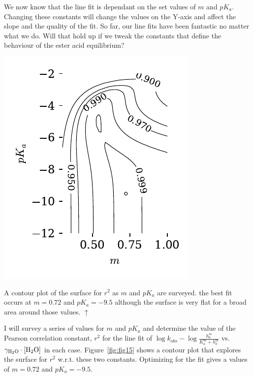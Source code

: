 \documentclass[]{tufte-handout}
\begin{document}
We now know that the line fit is dependant on the set values of $m$ and $pK_a$. Changing these constants will change the values on the Y-axis and affect the slope and the quality of the fit. So far, our line fits have been fantastic no matter what we do. Will that hold up if we tweak the constants that define the behaviour of the ester acid equilibrium?

\begin{marginfigure}[-0mm]
  \centering
  \includegraphics[scale=0.7]{images/fig15}
  \caption{A contour plot of the surface for $r^2$ as $m$ and $pK_a$ are surveyed. the best fit occurs at $m = 0.72$ and $pK_a = -9.5$ although the surface is very flat for a broad area around those values. $\uparrow$} 
  \label{fig:fig15}
\end{marginfigure}


I will survey a series of values for $m$ and $pK_a$ and determine the value of the Pearson correlation constant, $r^2$ for the line fit of $\log{k_{obs}}-\log{\frac{h_0^m}{K_a^m + h_0^m}}$ vs. $\gamma_{\ce{H2O}} \cdot [\ce{H2O}]$ in each case. Figure~\ref{fig:fig15} shows a contour plot that explores the surface for $r^2$ w.r.t. these two constants. Optimizing for the fit gives a values of $m = 0.72$ and $pK_a = -9.5$. 
\end{document}
